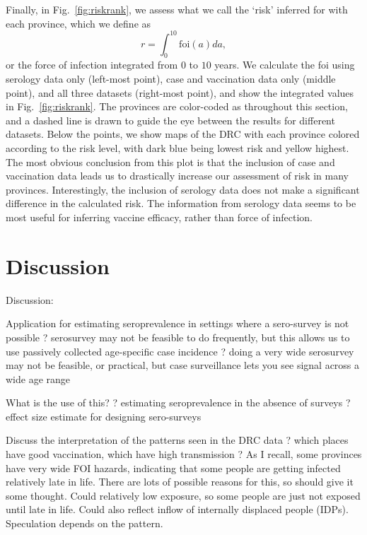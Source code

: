 \documentclass[nofootinbib,aps,pre,twocolumn,superscriptaddress,showkeys,showpacs]{revtex4-1}
\begin{document}
Finally, in Fig.~\ref{fig:riskrank}, we assess what we call the `risk' inferred for with each province, which we define as
\begin{equation}
r = \int_0^{10} \mathrm{foi}(a) da,
\end{equation}
 or the force of infection integrated from 0 to $10$ years. We calculate the foi using serology data only (left-most point), case and vaccination data only (middle point), and all three datasets (right-most point), and show the integrated values in Fig.~\ref{fig:riskrank}. The provinces are color-coded as throughout this section, and a dashed line is drawn to guide the eye between the results for different datasets. Below the points, we show maps of the DRC with each province colored according to the risk level, with dark blue being lowest risk and yellow highest. The most obvious conclusion from this plot is that the inclusion of case and vaccination data leads us to drastically increase our assessment of risk in many provinces. Interestingly, the inclusion of serology data does not make a significant difference in the calculated risk. The information from serology data seems to be most useful for inferring vaccine efficacy, rather than force of infection.

\section{Discussion \label{sec:Discussion}}
Discussion:

Application for estimating seroprevalence in settings where a sero-survey is not possible 
	? serosurvey may not be feasible to do frequently, but this allows us to use passively collected age-specific case incidence 
	? doing a very wide serosurvey may not be feasible, or practical, but case surveillance lets you see signal across a wide age range

What is the use of this?
	? estimating seroprevalence in the absence of surveys
	? effect size estimate for designing sero-surveys

Discuss the interpretation of the patterns seen in the DRC data 
	? which places have good vaccination, which have high transmission
	? As I recall, some provinces have very wide FOI hazards, indicating that some people are getting infected relatively late in life.  There are lots of possible reasons for this, so should give it some thought.  Could relatively low exposure, so some people are just not exposed until late in life.  Could also reflect inflow of internally displaced people (IDPs).  Speculation depends on the pattern. 
\end{document}
